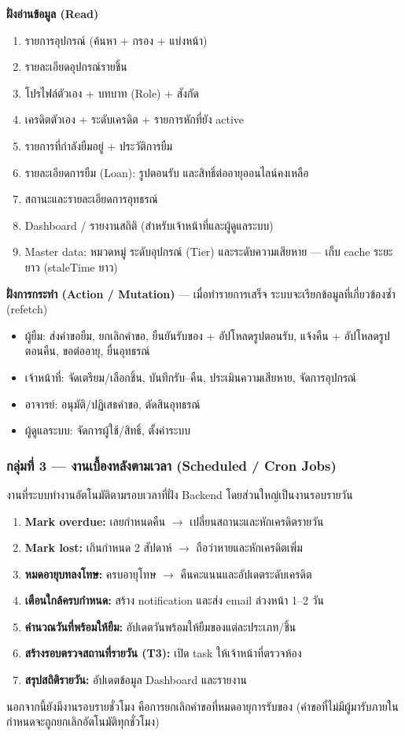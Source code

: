 \noindent\textbf{ฝั่งอ่านข้อมูล (Read)}
\begin{enumerate}
  \item รายการอุปกรณ์ (ค้นหา + กรอง + แบ่งหน้า)
  \item รายละเอียดอุปกรณ์รายชิ้น
  \item โปรไฟล์ตัวเอง + บทบาท (Role) + สังกัด
  \item เครดิตตัวเอง + ระดับเครดิต + รายการหักที่ยัง active
  \item รายการที่กำลังยืมอยู่ + ประวัติการยืม
  \item รายละเอียดการยืม (Loan): รูปตอนรับ และสิทธิ์ต่ออายุออนไลน์คงเหลือ
  \item สถานะและรายละเอียดการอุทธรณ์
  \item Dashboard / รายงานสถิติ (สำหรับเจ้าหน้าที่และผู้ดูแลระบบ)
  \item Master data: หมวดหมู่ ระดับอุปกรณ์ (Tier) และระดับความเสียหาย — เก็บ cache ระยะยาว (staleTime ยาว)
\end{enumerate}

\noindent\textbf{ฝั่งการกระทำ (Action / Mutation)} — เมื่อทำรายการเสร็จ ระบบจะเรียกข้อมูลที่เกี่ยวข้องซ้ำ (refetch)
\begin{itemize}
  \item ผู้ยืม: ส่งคำขอยืม, ยกเลิกคำขอ, ยืนยันรับของ + อัปโหลดรูปตอนรับ, แจ้งคืน + อัปโหลดรูปตอนคืน, ขอต่ออายุ, ยื่นอุทธรณ์
  \item เจ้าหน้าที่: จัดเตรียม/เลือกชิ้น, บันทึกรับ–คืน, ประเมินความเสียหาย, จัดการอุปกรณ์
  \item อาจารย์: อนุมัติ/ปฏิเสธคำขอ, ตัดสินอุทธรณ์
  \item ผู้ดูแลระบบ: จัดการผู้ใช้/สิทธิ์, ตั้งค่าระบบ
\end{itemize}

\subsubsection*{กลุ่มที่ 3 — งานเบื้องหลังตามเวลา (Scheduled / Cron Jobs)}

งานที่ระบบทำงานอัตโนมัติตามรอบเวลาที่ฝั่ง Backend โดยส่วนใหญ่เป็นงานรอบรายวัน

\begin{enumerate}
  \item \textbf{Mark overdue:} เลยกำหนดคืน $\rightarrow$ เปลี่ยนสถานะและหักเครดิตรายวัน
  \item \textbf{Mark lost:} เกินกำหนด 2 สัปดาห์ $\rightarrow$ ถือว่าหายและหักเครดิตเพิ่ม
  \item \textbf{หมดอายุบทลงโทษ:} ครบอายุโทษ $\rightarrow$ คืนคะแนนและอัปเดตระดับเครดิต
  \item \textbf{เตือนใกล้ครบกำหนด:} สร้าง notification และส่ง email ล่วงหน้า 1–2 วัน
  \item \textbf{คำนวณวันที่พร้อมให้ยืม:} อัปเดตวันพร้อมให้ยืมของแต่ละประเภท/ชิ้น
  \item \textbf{สร้างรอบตรวจสถานที่รายวัน (T3):} เปิด task ให้เจ้าหน้าที่ตรวจห้อง
  \item \textbf{สรุปสถิติรายวัน:} อัปเดตข้อมูล Dashboard และรายงาน
\end{enumerate}

\noindent นอกจากนี้ยังมีงานรอบรายชั่วโมง คือการยกเลิกคำขอที่หมดอายุการรับของ (คำขอที่ไม่มีผู้มารับภายในกำหนดจะถูกยกเลิกอัตโนมัติทุกชั่วโมง)
